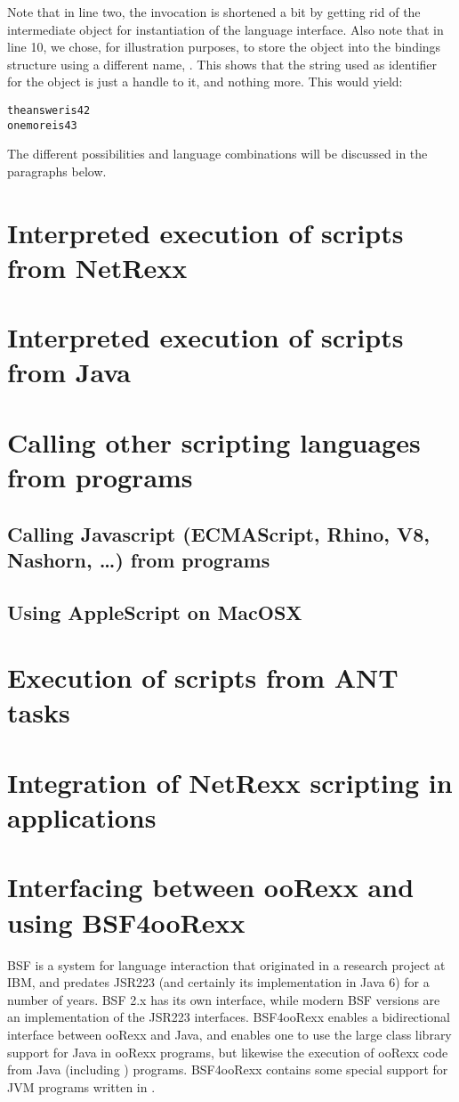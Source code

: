 Note that in line two, the invocation is shortened a bit by getting rid of the intermediate  object for instantiation of the language interface. Also note that in line 10, we chose, for illustration purposes, to store the  object into the bindings structure using a different name, . This shows that the string used as identifier for the object is just a handle to it, and nothing more.
This would yield:
\begin{alltt}
the answer is 42
one more is 43
\end{alltt}
The different possibilities and language combinations will be discussed in the paragraphs below.
 
\section{Interpreted execution of \nr{} scripts from NetRexx}
 
\section{Interpreted execution of \nr{} scripts from Java}
 
\section{Calling other scripting languages from \nr{} programs}
 
\subsection{Calling Javascript (ECMAScript, Rhino, V8, Nashorn, …) from \nr{} programs}
 
\subsection{Using AppleScript on MacOSX}
 
\section{Execution of \nr{} scripts from ANT tasks}
 
\section{Integration of NetRexx scripting in applications}
 
\section{Interfacing between ooRexx and \nr{} using BSF4ooRexx}
BSF is a system for language interaction that originated in a research project at IBM, and predates JSR223 (and certainly its implementation in Java 6) for a number of years. BSF 2.x has its own interface, while modern BSF versions are an implementation of the JSR223 interfaces. BSF4ooRexx enables a bidirectional interface between ooRexx and Java, and enables one to use the large class library support for Java in ooRexx programs, but likewise the execution of ooRexx code from Java (including \nr{}) programs. BSF4ooRexx contains some special support for JVM programs written in \nr{}.
